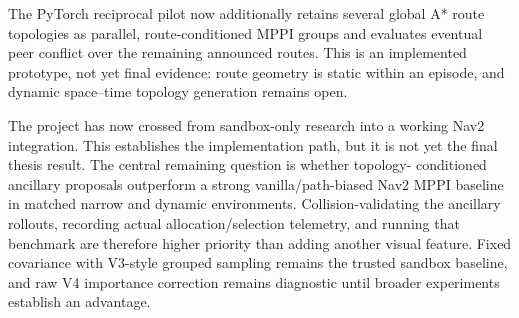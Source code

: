 \documentclass[11pt,a4paper]{article}
\begin{document}
The PyTorch reciprocal pilot now additionally retains several global A* route
topologies as parallel, route-conditioned MPPI groups and evaluates eventual
peer conflict over the remaining announced routes. This is an implemented
prototype, not yet final evidence: route geometry is static within an episode,
and dynamic space--time topology generation remains open.

The project has now crossed from sandbox-only research into a working Nav2
integration. This establishes the implementation path, but it is not yet the
final thesis result. The central remaining question is whether topology-
conditioned ancillary proposals outperform a strong vanilla/path-biased Nav2
MPPI baseline in matched narrow and dynamic environments. Collision-validating
the ancillary rollouts, recording actual allocation/selection telemetry, and
running that benchmark are therefore higher priority than adding another
visual feature. Fixed covariance with V3-style grouped sampling remains the
trusted sandbox baseline, and raw V4 importance correction remains diagnostic
until broader experiments establish an advantage.
\end{document}
